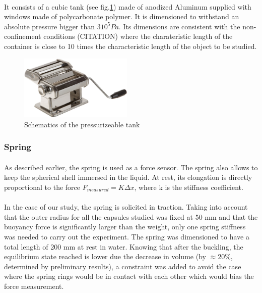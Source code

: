 \paragraph{}
It consists of a cubic tank (see fig.\ref{fig:tank}) made of anodized Aluminum supplied with windows made of polycarbonate polymer. It is dimensioned to withstand an absolute pressure bigger than $3 10^5 Pa$. Its dimensions are consistent with the non-confinement conditions (CITATION) where the charateristic length of the container is close to 10 times the characteristic length of the object to be studied.
\begin{figure}[h] %
	\centering%
  \includegraphics[width=0.48\textwidth]{figures/Chapter_1/rolling_machine.png}
	\caption{Schematics of the pressurizeable tank}
	\label{fig:tank}
\end{figure}
\subsubsection{Spring}
\paragraph{}
As described earlier, the spring is used as a force sensor. The spring also allows to keep the spherical shell immersed in the liquid.
At rest, its elongation is directly proportional to the force $F_{measured} = K \Delta x$, where k is the stiffness coefficient.
\paragraph{}
In the case of our study, the spring is solicited in traction. Taking into account that the outer radius for all the capsules studied was fixed at 50 mm and that the buoyancy force is significantly larger than the weight, only one spring stiffness was needed to carry out the experiment.
The spring was dimensioned to have a total length of 200 mm at rest in water. Knowing that after the buckling, the equilibrium state reached is lower due the decrease in volume (by $\approx 20\%$, determined by preliminary results), a constraint was added to avoid the case where the spring rings would be in contact with each other which would bias the force measurement.
